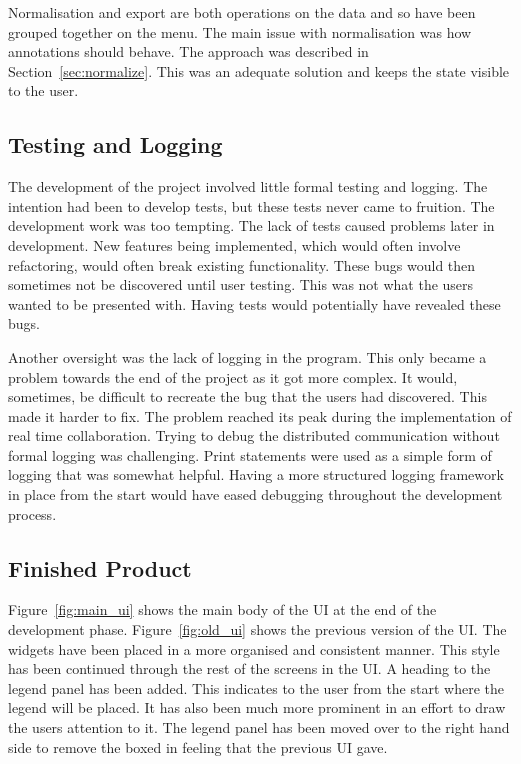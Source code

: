 Normalisation and export are both operations on the data and so have been grouped together on the menu.  The main issue with normalisation was how annotations should behave.  The approach was described in Section~\ref{sec:normalize}.  This was an adequate solution and keeps the state visible to the user.

\subsection{Testing and Logging}

The development of the project involved little formal testing and logging.  The intention had been to develop tests, but these tests never came to fruition.  The development work was too tempting. The lack of tests caused problems later in development.  New features being implemented, which would often involve refactoring, would often break existing functionality.  These bugs would then sometimes not be discovered until user testing.  This was not what the users wanted to be presented with.  Having tests would potentially have revealed these bugs.

Another oversight was the lack of logging in the program.  This only became a problem towards the end of the project as it got more complex.  It would, sometimes, be difficult to recreate the bug that the users had discovered.  This made it harder to fix.  The problem reached its peak during the implementation of real time collaboration.  Trying to debug the distributed communication without formal logging was challenging.  Print statements were used as a simple form of logging that was somewhat helpful.  Having a more structured logging framework in place from the start would have eased debugging throughout the development process.

\subsection{Finished Product}

Figure~\ref{fig:main_ui} shows the main body of the \ac{UI} at the end of the development phase.  Figure~\ref{fig:old_ui} shows the previous version of the \ac{UI}.  The widgets have been placed in a more organised and consistent manner.  This style has been continued through the rest of the screens in the \ac{UI}.  A heading to the legend panel has been added.  This indicates to the user from the start where the legend will be placed.  It has also been much more prominent in an effort to draw the users attention to it.  The legend panel has been moved over to the right hand side to remove the boxed in feeling that the previous \ac{UI} gave.

